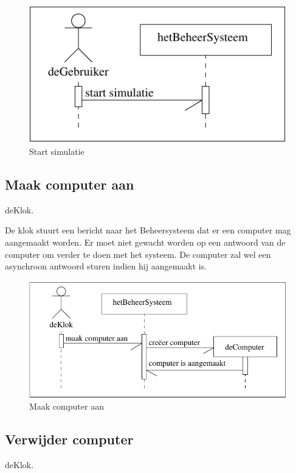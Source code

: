 \documentclass[a4paper,oneside]{report}
\begin{document}
\begin{figure}[h!]
\begin{center}
\includegraphics{seq_start_simulatie}
\caption{Start simulatie}
\end{center}
\end{figure}

\newpage
\subsection{Maak computer aan}
deKlok.

De klok stuurt een bericht naar het Beheersysteem dat er een computer mag aangemaakt worden. Er moet niet gewacht worden op een antwoord van de computer om verder te doen met het systeem. De computer zal wel een asynchroon antwoord sturen indien hij aangemaakt is.

\begin{figure}[h!]
\begin{center}
\includegraphics{seq_maak_computer_aan}
\caption{Maak computer aan}
\end{center}
\end{figure}

\newpage
\subsection{Verwijder computer}
 deKlok.
\end{document}
